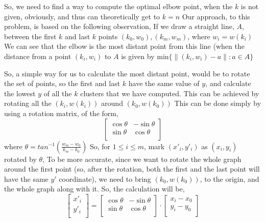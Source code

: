 \documentclass[12pt]{article}
\begin{document}
So, we need to find a way to compute the optimal elbow point, when the $k$ is not given, obviously, and thus can theoretically get to $k=n$\newline
Our approach, to this problem, is based on the following observation, \newline
If we draw a straight line, $A$, between the first $k$ and last $k$ points $(k_0,w_0),(k_m,w_m)$, 
where $w_i=w(k_i)$ \newline
We can see that the elbow is the most distant point from this line (when the distance from a point $(k_i,w_i)$ to $A$ is given by 
min$\{\lVert(k_i,w_i)-a\rVert : a \in A\}$  \newline

So, a simple way for us to calculate the most distant point, would be to rotate the set of points, \newline
so the first and last $k$ have the same value of $y$, and calculate the lowest $y$ of all the $k$ clusters
that we have computed. \newline
This can be achieved by rotating all the $(k_i,w(k_i))$ around $(k_0,w(k_0))$ \newline
This can be done simply by using a rotation matrix, of the form,
$$
\begin{bmatrix}
\cos\theta & -\sin\theta \\
\sin\theta & \cos\theta \\
\end{bmatrix}
$$
where $\theta=tan^{-1}(\frac{w_m-w_0}{k_m-k_0})$ \newline
So, for $1 \leq i \leq m$, mark $(x'_i,y'_i)$ as $(x_i,y_i)$ rotated by $\theta$, \newline
To be more accurate, since we want to rotate the whole graph around the first point \newline
(so, after the rotation, both the first and the last point will have the same $y'$ coordinate), \newline
we need to bring $(k_0,w(k_0))$, to the origin, and the whole graph along with it. \newline
So, the calculation will be, \newline
$$
\begin{bmatrix}
x'_i \\
y'_i \\
\end{bmatrix}=\begin{bmatrix}
\cos\theta & -\sin\theta \\
\sin\theta & \cos\theta \\
\end{bmatrix} \cdot \begin{bmatrix}
x_i-x_0 \\
y_i-y_0 \\
\end{bmatrix}
$$
\end{document}
